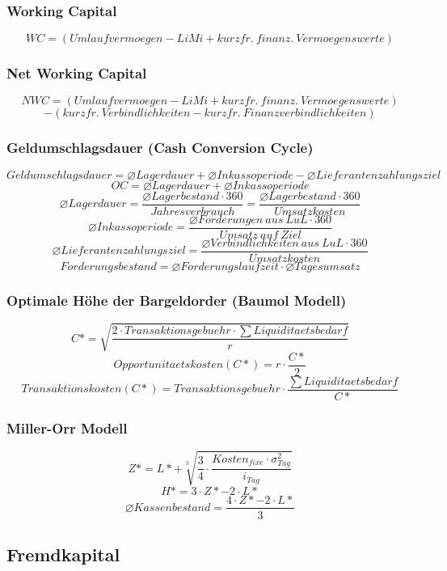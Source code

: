 \subsubsection{Working Capital}
\[WC = (Umlaufvermoegen - LiMi + kurzfr.~finanz.~Vermoegenswerte)\]

\subsubsection{Net Working Capital}
\[NWC = (Umlaufvermoegen - LiMi + kurzfr.~finanz.~Vermoegenswerte)\]
\[- (kurzfr.~Verbindlichkeiten - kurzfr.~Finanzverbindlichkeiten)\]

\subsubsection{Geldumschlagsdauer (Cash Conversion Cycle)}
\[Geldumschlagsdauer = \varnothing Lagerdauer + \varnothing Inkassoperiode - \varnothing Lieferantenzahlungsziel\]
\[OC = \varnothing Lagerdauer + \varnothing Inkassoperiode\]
\[\varnothing Lagerdauer = \frac{\varnothing Lagerbestand \cdot 360}{Jahresverbrauch} = \frac{\varnothing Lagerbestand \cdot 360}{Umsatzkosten}\]
\[\varnothing Inkassoperiode = \frac{\varnothing Forderungen~aus~LuL \cdot 360}{Umsatz~auf~Ziel}\]
\[\varnothing Lieferantenzahlungsziel = \frac{\varnothing Verbindlichkeiten~aus~LuL \cdot 360}{Umsatzkosten}\]
\[Forderungsbestand = \varnothing Forderungslaufzeit \cdot \varnothing Tagesumsatz\]

\subsubsection{Optimale Höhe der Bargeldorder (Baumol Modell)}
\[C* = \sqrt{\frac{2 \cdot Transaktionsgebuehr \cdot \sum Liquiditaetsbedarf}{r}}\]
\[Opportunitaetskosten(C*) = r \cdot \frac{C*}{2}\]
\[Transaktionskosten(C*) = Transaktionsgebuehr \cdot \frac{\sum Liquiditaetsbedarf}{C*}\]

\subsubsection{Miller-Orr Modell}
\[Z* = L* + \sqrt[3]{\frac{3}{4} \cdot \frac{Kosten_{fixe} \cdot \sigma_{Tag}^2}{i_{Tag}}}\]
\[H* = 3 \cdot Z* - 2 \cdot L*\]
\[\varnothing Kassenbestand = \frac{4 \cdot Z* - 2 \cdot L*}{3}\]


\subsection{Fremdkapital}

